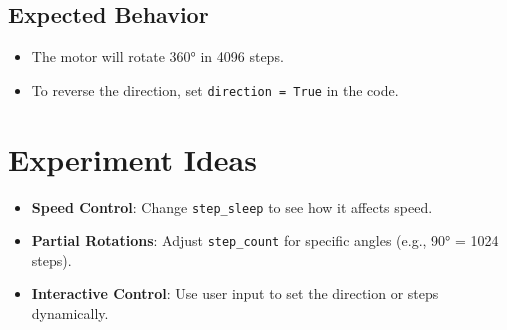 \documentclass{article}
\begin{document}
	\subsection*{Expected Behavior}
	\begin{itemize}
		\item The motor will rotate 360° in 4096 steps.
		\item To reverse the direction, set \texttt{direction = True} in the code.
	\end{itemize}
	
	\section*{Experiment Ideas}
	\begin{itemize}
		\item \textbf{Speed Control}: Change \texttt{step\_sleep} to see how it affects speed.
		\item \textbf{Partial Rotations}: Adjust \texttt{step\_count} for specific angles (e.g., 90° = 1024 steps).
		\item \textbf{Interactive Control}: Use user input to set the direction or steps dynamically.
	\end{itemize}
	
\end{document}
